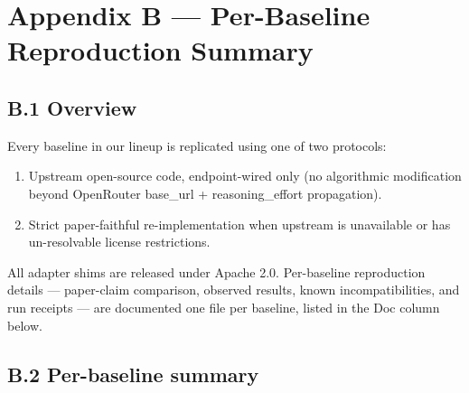 \section{Appendix B --- Per-Baseline Reproduction Summary}\label{appendix-b-per-baseline-reproduction-summary}

\subsection{B.1 Overview}\label{b.1-overview}

Every baseline in our lineup is replicated using one of two protocols:

\begin{enumerate}
\def\labelenumi{\arabic{enumi}.}
\tightlist
\item
  Upstream open-source code, endpoint-wired only (no algorithmic
  modification beyond OpenRouter base\_url + reasoning\_effort
  propagation).
\item
  Strict paper-faithful re-implementation when upstream is unavailable
  or has un-resolvable license restrictions.
\end{enumerate}

All adapter shims are released under Apache 2.0. Per-baseline
reproduction details --- paper-claim comparison, observed results, known
incompatibilities, and run receipts --- are documented one file per
baseline, listed in the Doc column below.

\subsection{B.2 Per-baseline summary}\label{b.2-per-baseline-summary}

